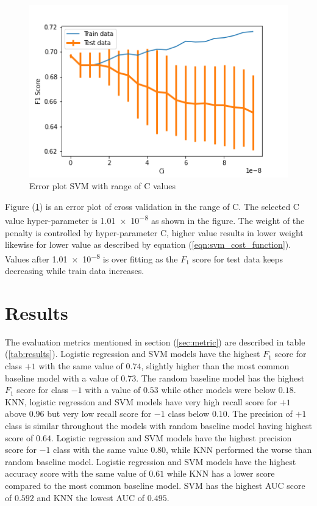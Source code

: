 \documentclass[transmag]{IEEEtran}
\begin{document}
\begin{figure}[h]
	\includegraphics[width=\columnwidth]{svm_cv_ci.png} 
    \caption{Error plot SVM with range of C values}%
    \label{fig:svm_c}%
\end{figure}

\noindent Figure (\ref{fig:svm_c}) is an error plot of cross validation in the range of C. The selected C value hyper-parameter is \num{1.01e-8} as shown in the figure. The weight of the penalty is controlled by hyper-parameter C, higher value results in lower weight likewise for lower value as described by equation (\ref{eqn:svm_cost_function}). Values after \num{1.01e-8} is over fitting as the $F_1$ score for test data keeps decreasing while train data increases.

\section{Results}

\noindent The evaluation metrics mentioned in section (\ref{sec:metric}) are described in table (\ref{tab:results}). Logistic regression and SVM models have the highest $F_1$ score for class $+1$ with the same value of $0.74$, slightly higher than the most common baseline model with a value of $0.73$. The random baseline model has the highest $F_1$ score for class $-1$ with a value of $0.53$ while other models were below $0.18$. KNN, logistic regression and SVM models have very high recall score for $+1$ above $0.96$ but very low recall score for $-1$ class below $0.10$. The precision of $+1$ class is similar throughout the models with random baseline model having highest score of $0.64$. Logistic regression and SVM models have the highest precision score for $-1$ class with the same value $0.80$, while KNN performed the worse than random baseline model. Logistic regression and SVM models have the highest accuracy score with the same value of $0.61$ while KNN has a lower score compared to the most common baseline model. SVM has the highest AUC score of $0.592$ and KNN the lowest AUC of $0.495$.
\end{document}

